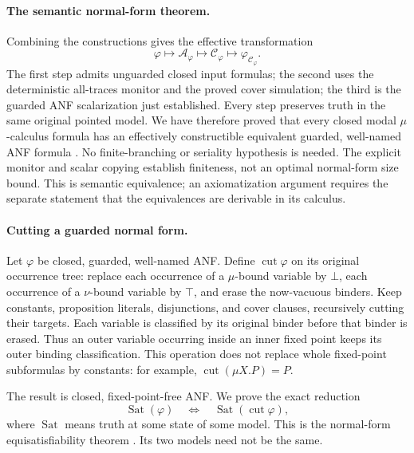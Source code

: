 \paragraph{The semantic normal-form theorem.}
\label{sec:p09-mu-semantic-normal-form}
Combining the constructions gives
the effective transformation
\[
 \varphi
 \longmapsto\mathcal A_\varphi
 \longmapsto\mathcal C_\varphi
 \longmapsto\varphi_{\mathcal C_\varphi}.
\]
The first step admits unguarded
closed input formulas; the
second uses the deterministic
all-traces monitor and the
proved cover simulation; the
third is the guarded ANF
scalarization just established.
Every step preserves truth
in the same original pointed
model. We have therefore
proved that every closed
modal \(\mu\)-calculus formula
has an effectively constructible
equivalent guarded, well-named
ANF formula
\cite[thm.~4.4]{JaninWalukiewicz1995}.
No finite-branching or
seriality hypothesis is needed.
The explicit monitor and scalar
copying establish finiteness,
not an optimal normal-form
size bound.
This is semantic equivalence;
an axiomatization argument
requires the separate statement
that the equivalences are
derivable in its calculus.

\paragraph{Cutting a guarded normal form.}
\label{sec:p09-mu-anf-cut}
Let \(\varphi\) be closed,
guarded, well-named ANF.
Define \(\operatorname{cut}\varphi\)
on its original occurrence tree:
replace each occurrence of a
\(\mu\)-bound variable by \(\bot\),
each occurrence of a \(\nu\)-bound
variable by \(\top\), and
erase the now-vacuous binders.
Keep constants, proposition literals,
disjunctions, and cover clauses,
recursively cutting their targets.
Each variable is classified by
its original binder before that
binder is erased. Thus an outer
variable occurring inside an
inner fixed point keeps its
outer binding classification.
This operation does not replace
whole fixed-point subformulas
by constants: for example,
\(\operatorname{cut}(\mu X.P)=P\).

The result is closed, fixed-point-free
ANF. We prove the exact reduction
\[
 \operatorname{Sat}(\varphi)
 \quad\Longleftrightarrow\quad
 \operatorname{Sat}(\operatorname{cut}\varphi),
\]
where \(\operatorname{Sat}\) means
truth at some state of some model.
This is the normal-form
equisatisfiability theorem
\cite[thm.~4.6]{JaninWalukiewicz1995}.
Its two models need not be
the same.

